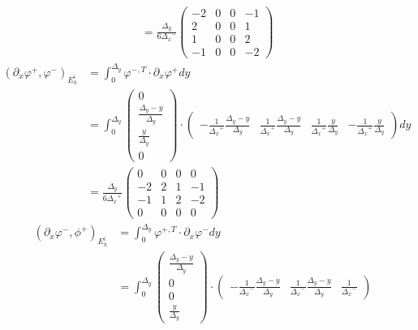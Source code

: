 \documentclass{mc2013}
\newcommand\tf{\varphi}
\renewcommand{\(}{\left(}
\renewcommand{\)}{\right)}
\renewcommand{\[}{\left[}
\renewcommand{\]}{\right]}
\begin{document}
\begin{itemize}
\begin{equation}
\begin{split}
&= \frac{{\Delta _y}}{6{\Delta _x}^-} 
\begin{pmatrix}
-2 & 0 & 0 & -1 \\
2 & 0 & 0 & 1 \\
1 & 0 & 0 & 2 \\
-1 & 0 & 0 & -2
\end{pmatrix}
\end{split}
\end{equation}
\begin{equation}
\begin{split}
\(\partial_x \tf^{+},\tf^{-}\)_{E_h^i} &= \int_0^{\Delta _y} \tf^{-,T} \cdot
\partial_x \tf^{+} dy\\
&= \int_0^{\Delta _y} 
\begin{pmatrix}
0 \\
\frac{{\Delta _y}-y}{{\Delta _y}} \\
\frac{y}{{\Delta _y}} \\
0
\end{pmatrix}
\cdot
\begin{pmatrix}
-\frac{1}{{\Delta _x}^+}\frac{{\Delta _y}-y}{{\Delta _y}} & \frac{1}{{\Delta _x}^+} \frac{{\Delta _y}-y}{{\Delta _y}} & \frac{1}{{\Delta _x}^+}
\frac{y}{{\Delta _y}} & -\frac{1}{{\Delta _x}^+} \frac{y}{{\Delta _y}} 
\end{pmatrix}
dy\\
&= \frac{{\Delta _y}}{6{\Delta _x}^+}
\begin{pmatrix}
0 & 0 & 0 & 0 \\
-2 & 2 & 1 & -1 \\
-1 & 1 & 2 & -2 \\
0 & 0 & 0 & 0
\end{pmatrix}
\end{split}
\end{equation}
\begin{equation}
\begin{split}
\(\partial_x \tf^-,\phi^{+}\)_{E_h^i} &= \int_0^{\Delta _y} \tf^{+,T}\cdot \partial_x
\tf^{-} dy\\
&=\int_0^{\Delta _y}
\begin{pmatrix}
\frac{{\Delta _y}-y}{{\Delta _y}}\\
0 \\
0 \\
\frac{y}{{\Delta _y}}
\end{pmatrix}
\cdot
\begin{pmatrix}
-\frac{1}{{\Delta _x}^-}\frac{{\Delta _y}-y}{{\Delta _y}} & \frac{1}{{\Delta _x}^-} \frac{{\Delta _y}-y}{{\Delta _y}} & \frac{1}{{\Delta _x}^-}

\end{pmatrix}
\end{split}
\end{equation}
\end{itemize}
\end{document}
